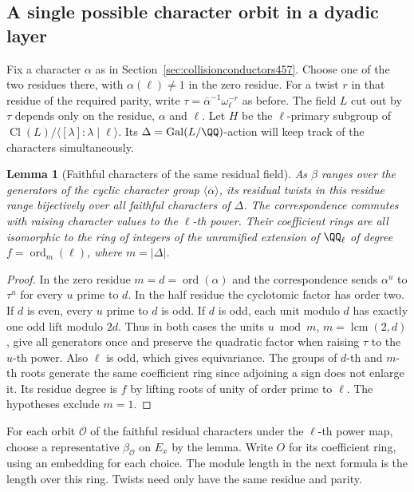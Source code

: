 \documentclass[a4paper,11pt]{article}
\newtheorem{lemma}[proposition]{Lemma}
\theoremstyle{definition}
\theoremstyle{remark}
\numberwithin{equation}{section}
\newcommand{\Cl}{\operatorname{Cl}}
\begin{document}
\subsection{A single possible character orbit in a dyadic layer}
\label{sec:collisionorbits459}

Fix a character \(\alpha\) as in Section~\ref{sec:collisionconductors457}.
Choose one of the two residues there, with \(\alpha(\ell)\ne1\) in
the zero residue. For a twist \(r\) in that residue of the required
parity, write \(\tau=\bar\alpha^{-1}\omega_\ell^{-r}\) as before.
The field \(L\) cut out by \(\tau\) depends only on the residue,
\(\alpha\) and \(\ell\). Let \(H\) be the \(\ell\)-primary subgroup of
\(\Cl(L)/\langle[\lambda]\mathrel{:}\lambda\mid\ell\rangle\).
Its \(\Delta=\operatorname{Gal}(L/\QQ)\)-action will keep track of
the characters simultaneously.

\begin{lemma}[Faithful characters of the same residual field]\leavevmode
\label{lem:collisionorbits459}
As \(\beta\) ranges over the generators of the cyclic character
group \(\langle\alpha\rangle\), its residual twists in this residue
range bijectively over all faithful characters of \(\Delta\).
The correspondence commutes with raising character values to the
\(\ell\)-th power. Their coefficient rings are all isomorphic to
the ring of integers of the unramified extension of \(\QQ_\ell\)
of degree \(f=\operatorname{ord}_m(\ell)\), where \(m=|\Delta|\).
\end{lemma}
\begin{proof}
In the zero residue \(m=d=\operatorname{ord}(\alpha)\) and the
correspondence sends \(\alpha^u\) to \(\tau^u\) for every
\(u\) prime to \(d\). In the half residue the cyclotomic factor
has order two. If \(d\) is even, every \(u\) prime to \(d\) is
odd. If \(d\) is odd, each unit modulo \(d\) has exactly one
odd lift modulo \(2d\). Thus in both cases the units \(u\bmod m\),
\(m=\operatorname{lcm}(2,d)\), give all generators once and
preserve the quadratic factor when raising \(\tau\) to the
\(u\)-th power. Also \(\ell\) is odd, which gives equivariance.
The groups of \(d\)-th and \(m\)-th roots generate the same
coefficient ring since adjoining a sign does not enlarge it.
Its residue degree is \(f\) by lifting roots of unity of order
prime to \(\ell\). The hypotheses exclude \(m=1\).
\end{proof}

For each orbit \(\mathcal O\) of the faithful residual characters
under the \(\ell\)-th power map, choose a representative
\(\beta_{\mathcal O}\) on \(E_x\) by the lemma. Write \(O\) for
its coefficient ring, using an embedding for each choice.
The module length in the next formula is the length over this
ring. Twists need only have the same residue and parity.
\end{document}
